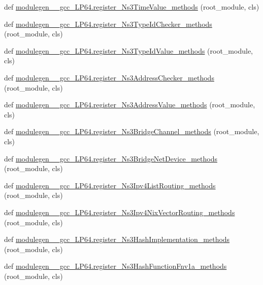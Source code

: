 \begin{DoxyCompactItemize}
\item 
def \hyperlink{namespacemodulegen____gcc__LP64_a074f52c8db74b3898d974bf33a0240f8}{modulegen\+\_\+\+\_\+gcc\+\_\+\+L\+P64.\+register\+\_\+\+Ns3\+Time\+Value\+\_\+methods} (root\+\_\+module, cls)
\item 
def \hyperlink{namespacemodulegen____gcc__LP64_aaf5d00575008532556e0df2d3b8d5bef}{modulegen\+\_\+\+\_\+gcc\+\_\+\+L\+P64.\+register\+\_\+\+Ns3\+Type\+Id\+Checker\+\_\+methods} (root\+\_\+module, cls)
\item 
def \hyperlink{namespacemodulegen____gcc__LP64_ab25f30f66f8ae8da64444bac683dac7c}{modulegen\+\_\+\+\_\+gcc\+\_\+\+L\+P64.\+register\+\_\+\+Ns3\+Type\+Id\+Value\+\_\+methods} (root\+\_\+module, cls)
\item 
def \hyperlink{namespacemodulegen____gcc__LP64_a89e9f561a2c1e1e454b475d69805122f}{modulegen\+\_\+\+\_\+gcc\+\_\+\+L\+P64.\+register\+\_\+\+Ns3\+Address\+Checker\+\_\+methods} (root\+\_\+module, cls)
\item 
def \hyperlink{namespacemodulegen____gcc__LP64_afbde1a3f3b1b9e58c7c95df3cbbef1ae}{modulegen\+\_\+\+\_\+gcc\+\_\+\+L\+P64.\+register\+\_\+\+Ns3\+Address\+Value\+\_\+methods} (root\+\_\+module, cls)
\item 
def \hyperlink{namespacemodulegen____gcc__LP64_a3aa114daceabb9b4e311b3fddec7d792}{modulegen\+\_\+\+\_\+gcc\+\_\+\+L\+P64.\+register\+\_\+\+Ns3\+Bridge\+Channel\+\_\+methods} (root\+\_\+module, cls)
\item 
def \hyperlink{namespacemodulegen____gcc__LP64_a575226cdd358dec93647fe0146cc2aa9}{modulegen\+\_\+\+\_\+gcc\+\_\+\+L\+P64.\+register\+\_\+\+Ns3\+Bridge\+Net\+Device\+\_\+methods} (root\+\_\+module, cls)
\item 
def \hyperlink{namespacemodulegen____gcc__LP64_a14e408ace9b8aef53ece36bfcd1c9861}{modulegen\+\_\+\+\_\+gcc\+\_\+\+L\+P64.\+register\+\_\+\+Ns3\+Ipv4\+List\+Routing\+\_\+methods} (root\+\_\+module, cls)
\item 
def \hyperlink{namespacemodulegen____gcc__LP64_a58a057f1804c2f4c8ac5efa7502c856f}{modulegen\+\_\+\+\_\+gcc\+\_\+\+L\+P64.\+register\+\_\+\+Ns3\+Ipv4\+Nix\+Vector\+Routing\+\_\+methods} (root\+\_\+module, cls)
\item 
def \hyperlink{namespacemodulegen____gcc__LP64_afdc62559dc296b925757fa93e7cd4260}{modulegen\+\_\+\+\_\+gcc\+\_\+\+L\+P64.\+register\+\_\+\+Ns3\+Hash\+Implementation\+\_\+methods} (root\+\_\+module, cls)
\item 
def \hyperlink{namespacemodulegen____gcc__LP64_ae9b88db2dea3c59f886d0be14d039694}{modulegen\+\_\+\+\_\+gcc\+\_\+\+L\+P64.\+register\+\_\+\+Ns3\+Hash\+Function\+Fnv1a\+\_\+methods} (root\+\_\+module, cls)

\end{DoxyCompactItemize}
